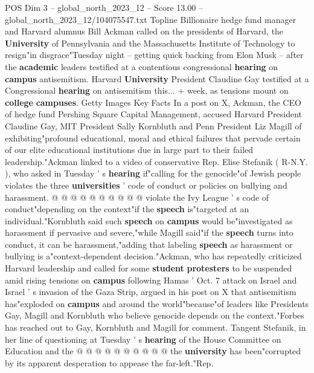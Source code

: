 \begin{textsample}{POS Dim 3 – global\_north\_2023\_12 – Score 13.00 – global\_north\_2023\_12/104075547.txt}  \label{ex:f3_pos_266}
Topline Billionaire hedge fund manager and Harvard alumnus Bill Ackman called on the presidents of Harvard, the \textbf{University} of Pennsylvania and the Massachusetts Institute of Technology to resign"in disgrace"Tuesday night -- getting quick backing from Elon Musk -- after the \textbf{academic} leaders testified at a contentious congressional \textbf{hearing} on \textbf{campus} antisemitism.
Harvard \textbf{University} President Claudine Gay testified at a Congressional \textbf{hearing} on antisemitism this... + week, as tensions mount on \textbf{college} \textbf{campuses}.
Getty Images Key Facts In a post on X, Ackman, the CEO of hedge fund Pershing Square Capital Management, accused Harvard President Claudine Gay, MIT President Sally Kornbluth and Penn President Liz Magill of exhibiting"profound educational, moral and ethical failures that pervade certain of our elite educational institutions due in large part to their failed leadership."Ackman linked to a video of conservative Rep.
Elise Stefanik ( R-N.Y. ), who asked in Tuesday ' s \textbf{hearing} if"calling for the genocide"of Jewish people violates the three \textbf{universities} ' code of conduct or policies on bullying and harassment. @ @ @ @ @ @ @ @ @ @ violate the Ivy League ' s code of conduct"depending on the context"if the \textbf{speech} is"targeted at an individual."Kornbluth said such \textbf{speech} on \textbf{campus} would be"investigated as harassment if pervasive and severe,"while Magill said"if the \textbf{speech} turns into conduct, it can be harassment,"adding that labeling \textbf{speech} as harassment or bullying is a"context-dependent decision."Ackman, who has repeatedly criticized Harvard leadership and called for some \textbf{student} \textbf{protesters} to be suspended amid rising tensions on \textbf{campus} following Hamas ' Oct. 7 attack on Israel and Israel ' s invasion of the Gaza Strip, argued in his post on X that antisemitism has"exploded on \textbf{campus} and around the world"because"of leaders like Presidents Gay, Magill and Kornbluth who believe genocide depends on the context."Forbes has reached out to Gay, Kornbluth and Magill for comment.
Tangent Stefanik, in her line of questioning at Tuesday ' s \textbf{hearing} of the House Committee on Education and the @ @ @ @ @ @ @ @ @ @ the \textbf{university} has been"corrupted by its apparent desperation to appease the far-left."Rep.

\end{textsample}
